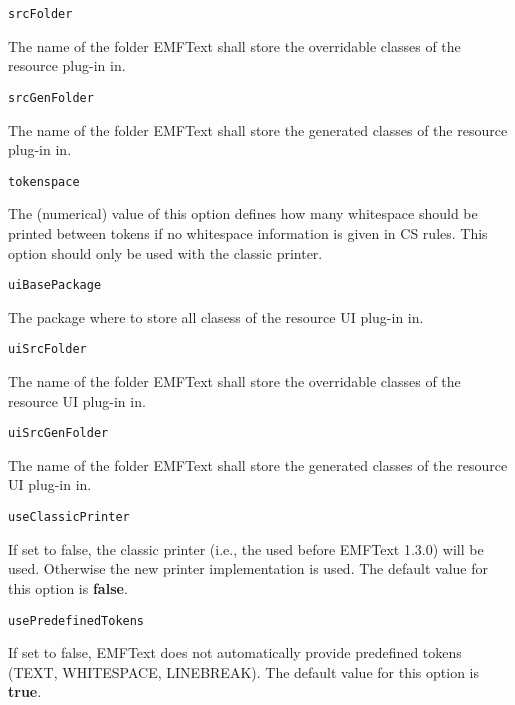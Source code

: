 \noindent\texttt{srcFolder}
\begin{myindentpar}{1cm}
The name of the folder EMFText shall store the overridable classes of the resource plug-in in.
\end{myindentpar}

\noindent\texttt{srcGenFolder}
\begin{myindentpar}{1cm}
The name of the folder EMFText shall store the generated classes of the resource plug-in in.
\end{myindentpar}

\noindent\texttt{tokenspace}
\begin{myindentpar}{1cm}
The (numerical) value of this option defines how many whitespace should be printed between tokens if no whitespace information is given in CS rules. This option should only be used with the classic printer.
\end{myindentpar}

\noindent\texttt{uiBasePackage}
\begin{myindentpar}{1cm}
The package where to store all clasess of the resource UI plug-in in.
\end{myindentpar}

\noindent\texttt{uiSrcFolder}
\begin{myindentpar}{1cm}
The name of the folder EMFText shall store the overridable classes of the resource UI plug-in in.
\end{myindentpar}

\noindent\texttt{uiSrcGenFolder}
\begin{myindentpar}{1cm}
The name of the folder EMFText shall store the generated classes of the resource UI plug-in in.
\end{myindentpar}

\noindent\texttt{useClassicPrinter}
\begin{myindentpar}{1cm}
If set to false, the classic printer (i.e., the used before EMFText 1.3.0) will be used. Otherwise the new printer implementation is used. The default value for this option is \textbf{false}.
\end{myindentpar}

\noindent\texttt{usePredefinedTokens}
\begin{myindentpar}{1cm}
If set to false, EMFText does not automatically provide predefined tokens (TEXT, WHITESPACE, LINEBREAK). The default value for this option is \textbf{true}.
\end{myindentpar}

